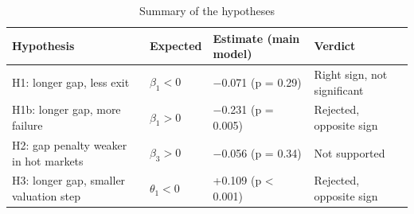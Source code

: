\begin{table}[tbp]
\centering\footnotesize
\caption{Summary of the hypotheses}
\label{tab:T13}
\begin{tabular}{llll}
\toprule
Hypothesis & Expected & Estimate (main model) & Verdict \\
\midrule
H1: longer gap, less exit & $\beta_1<0$ & $-$0.071 (p = 0.29) & Right sign, not significant \\
H1b: longer gap, more failure & $\beta_1>0$ & $-$0.231 (p = 0.005) & Rejected, opposite sign \\
H2: gap penalty weaker in hot markets & $\beta_3>0$ & $-$0.056 (p = 0.34) & Not supported \\
H3: longer gap, smaller valuation step & $\theta_1<0$ & +0.109 (p < 0.001) & Rejected, opposite sign \\
\bottomrule
\end{tabular}

\end{table}
